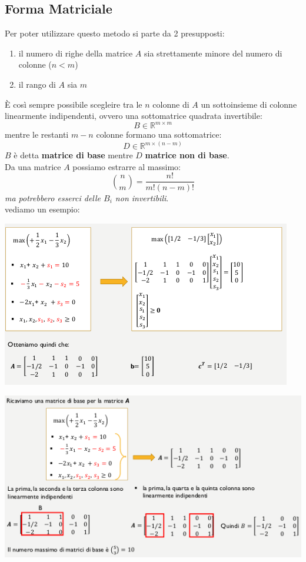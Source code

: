 \documentclass[a4paper,12pt, oneside]{book}
\begin{document}
\subsection{Forma Matriciale}
Per poter utilizzare questo metodo si parte da 2 presupposti:
\begin{enumerate}
  \item il numero di righe della matrice $A$ sia strettamente
  minore del numero di colonne ($n<m$)
  \item il rango di $A$ sia $m$
\end{enumerate}
È così sempre possibile scegleire tra le $n$ colonne di $A$ un
sottoinsieme di colonne linearmente indipendenti, ovvero una
sottomatrice quadrata invertibile:
\[B\in\mathbb{R}^{m\times m}\]
mentre le restanti $m-n$ colonne formano una sottomatrice:
\[D\in\mathbb{R}^{m\times (n-m)}\]
$B$ è detta \textbf{matrice di base} mentre $D$ \textbf{matrice non di
  base}.\\
Da una matrice $A$ possiamo estrarre al massimo:
\[{n\choose m}=\frac{n!}{m!(n-m)!}\]
\textit{ma potrebbero esserci delle $B_i$ non invertibili}.\\
vediamo un esempio:
\begin{center}
  \includegraphics[scale = 1]{img/matr.png}
\end{center}
\begin{center}
  \includegraphics[scale = 1]{img/matr2.png}
\end{center}
\end{document}
